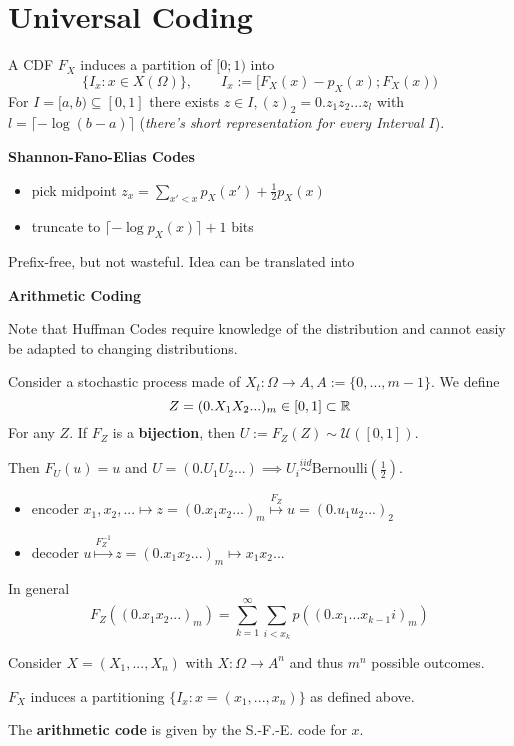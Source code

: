 \section{Universal Coding}

A CDF \(F_X\) induces a partition of \([0; 1)\) into 
\[\{I_x: x \in X(\Omega)\}, \qquad I_x := [F_X(x) - p_X(x); F_X(x))\]
For \(I = [a, b) \subseteq [0,1]\) there exists \(z \in I, (z)_2 = 0.z_1z_2...z_l\)
with \(l = \lceil - \log(b-a)\rceil\) (\textit{there's short representation for every Interval \(I\)}).

\textbf{Shannon-Fano-Elias Codes}
\begin{itemize}[label=-]
    \item pick midpoint \(z_x = \sum_{x' < x} p_X(x') + \frac{1}{2}p_X(x)\)
    \item truncate to \(\lceil - \log p_X(x) \rceil + 1\) bits
\end{itemize}
Prefix-free, but not wasteful. Idea can be translated into 

\textbf{Arithmetic Coding}

Note that Huffman Codes require knowledge of the distribution and cannot easiy be adapted to changing distributions.

Consider a stochastic process made of \(X_t: \Omega \to A, A := \{0, ..., m-1\}\). We define 
\[Z = (0.X_1X_2...)_m \in [0, 1] \subset \mathbb{R}\]
For any \(Z\). If \(F_Z\) is a \textbf{bijection}, then \(U := F_Z(Z) \sim \mathcal{U}([0,1])\).

Then \(F_U(u) = u\) and \(U = (0.U_1U_2...) \implies U_i \overset{iid}{\sim} \text{Bernoulli}\left(\frac{1}{2}\right)\).

\begin{itemize}[label=-]
    \item encoder \(x_1, x_2,... \mapsto z = (0.x_1x_2...)_m \overset{F_Z}{\mapsto} u = (0.u_1u_2...)_2\)
    \item decoder \(u \overset{F_Z^{-1}}{\mapsto} z = (0.x_1x_2...)_m \mapsto x_1x_2...\)
\end{itemize}

In general 
\[F_Z((0.x_1x_2...)_m) = \sum_{k = 1}^\infty \sum_{i < x_{k}}p((0.x_1...x_{k-1}i)_m)\]


Consider \(X =(X_1, ...,X_n)\) with \(X: \Omega \to A^n\) and thus \(m^n\) possible outcomes.

\(F_X\) induces a partitioning \(\{I_x: x = (x_1, ..., x_n)\}\) as defined above.

The \textbf{arithmetic code} is given by the S.-F.-E. code for \(x\).

